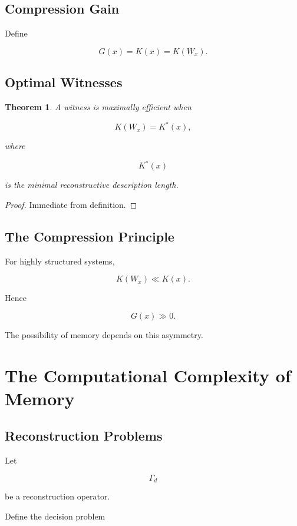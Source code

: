 \documentclass[12pt,oneside]{book}
\theoremstyle{plain} \newtheorem{theorem}{Theorem}[chapter] \newtheorem{lemma}[theorem]{Lemma} \newtheorem{proposition}[theorem]{Proposition} \newtheorem{corollary}[theorem]{Corollary}
\theoremstyle{definition} \newtheorem{definition}[theorem]{Definition} \newtheorem{axiom}[theorem]{Axiom} \newtheorem{construction}[theorem]{Construction}
\theoremstyle{remark} \newtheorem{remark}[theorem]{Remark} \newtheorem{example}[theorem]{Example}
\begin{document}
\section{Compression Gain}

Define

\[
G(x)
=
K(x)
=
K(W_x).
\]

\section{Optimal Witnesses}

\begin{theorem}

A witness is maximally efficient when

\[
K(W_x)
=
K^*(x),
\]

where

\[
K^*(x)
\]

is the minimal reconstructive description length.

\end{theorem}

\begin{proof}

Immediate from definition.

\end{proof}

\section{The Compression Principle}

For highly structured systems,

\[
K(W_x)
\ll
K(x).
\]

Hence

\[
G(x)
\gg
0.
\]

The possibility of memory depends on this asymmetry.

\chapter{The Computational Complexity of Memory}

\section{Reconstruction Problems}

Let

\[
\Gamma_d
\]

be a reconstruction operator.

Define the decision problem
\end{document}
